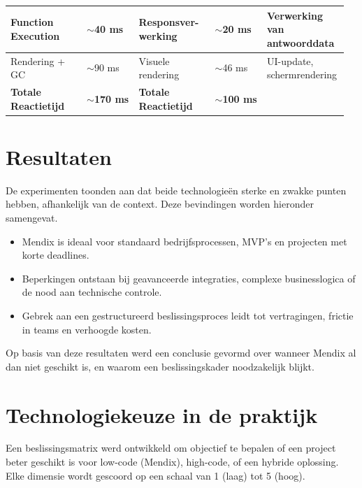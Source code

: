\documentclass[a0,portrait]{hogent-poster}
\begin{document}
\begin{multicols}{2}
\begin{center}
\begin{minipage}{0.48\linewidth}
\begin{tabular}{|p{0.22\linewidth}|p{0.15\linewidth}|p{0.22\linewidth}|p{0.15\linewidth}|p{0.22\linewidth}|}
                    \hline
                    Function \newline Execution & $\sim$40 ms & Responsver- werking & $\sim$20 ms & Verwerking van antwoorddata \\
                    \hline
                    Rendering + GC & $\sim$90 ms & Visuele \newline rendering & $\sim$46 ms & UI-update, schermrendering \\
                    \hline
                    \textbf{Totale \newline Reactietijd} & \textbf{$\sim$170 ms} & \textbf{Totale \newline Reactietijd} & \textbf{$\sim$100 ms} &  \\
                    \hline
                \end{tabular}
            \end{minipage}
        \end{center}
        
       \section{Resultaten}
       De experimenten toonden aan dat beide technologieën sterke en zwakke punten hebben, afhankelijk van de context. Deze bevindingen worden hieronder samengevat.
        \begin{itemize}
            \item Mendix is ideaal voor standaard bedrijfsprocessen, MVP's en projecten met korte deadlines.
            \item Beperkingen ontstaan bij geavanceerde integraties, complexe businesslogica of de nood aan technische controle.
            \item Gebrek aan een gestructureerd beslissingsproces leidt tot vertragingen, frictie in teams en verhoogde kosten.
        \end{itemize}
        Op basis van deze resultaten werd een conclusie gevormd over wanneer Mendix al dan niet geschikt is, en waarom een beslissingskader noodzakelijk blijkt.
        
        \section{Technologiekeuze in de praktijk}
        
        Een beslissingsmatrix werd ontwikkeld om objectief te bepalen of een project beter geschikt is voor low-code (Mendix), high-code, of een hybride oplossing. Elke dimensie wordt gescoord op een schaal van 1 (laag) tot 5 (hoog).
        

\end{multicols}
\end{document}
